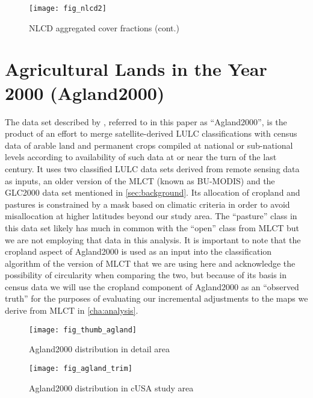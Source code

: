 \begin{figure}[ht] 
  \centering
  
  \texttt{[image: fig\_nlcd2]}
\caption{NLCD aggregated cover fractions (cont.)}
\label{fig:nlcd2}
\end{figure} 

\clearpage

\section{Agricultural Lands in the Year 2000 (Agland2000)}
\label{sec:agland2000}


The data set described by \citet{Ramankutty2008}, referred to in this
paper as ``Agland2000'', is the product of an effort to merge
satellite-derived LULC classifications with census data of arable land
and permanent crops compiled at national or sub-national levels
according to availability of such data at or near the turn of the last
century.  It uses two classified LULC data sets derived from remote
sensing data as inputs, an older version of the MLCT (known as
BU-MODIS) and the GLC2000 data set mentioned in
\autoref{sec:background}.  Its allocation of cropland and pastures is
constrained by a mask based on climatic criteria in order to avoid
misallocation at higher latitudes beyond our study area.  The
``pasture'' class in this data set likely has much in common with the
``open'' class from MLCT but we are not employing that data in this
analysis. It is important to note that the cropland aspect of
Agland2000 is used as an input into the classification algorithm of
the version of MLCT that we are using here and acknowledge the
possibility of circularity when comparing the two, but because of its
basis in census data we will use the cropland component of Agland2000
as an ``observed truth'' for the purposes of evaluating our
incremental adjustments to the maps we derive from MLCT in
\autoref{cha:analysis}.
  

\begin{figure}[ht]
\centering
  

\texttt{[image: fig\_thumb\_agland]}
 
\caption{Agland2000 distribution in detail area}
\label{fig:thumb_agland} 
\end{figure} 

\begin{figure}[ht]
\centering
  


\texttt{[image: fig\_agland\_trim]}
 
\caption{Agland2000 distribution in cUSA study area}
\label{fig:agland} 
\end{figure} 

